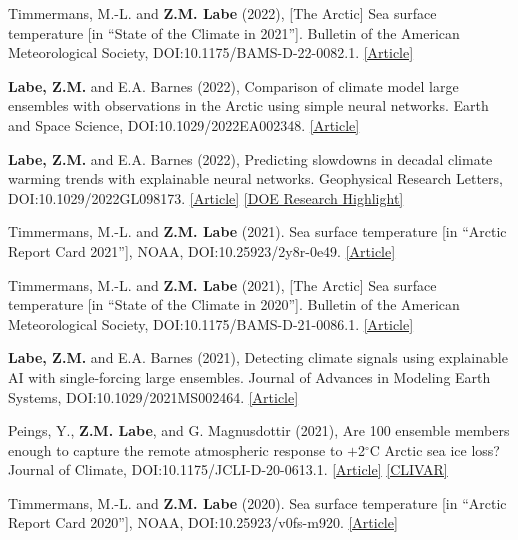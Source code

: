 \documentclass[margin,line,palatino,courier,10pt]{res}
\begin{document}
\begin{resume}
\begin{etaremune}[leftmargin=0in,topsep=0in,parsep=0in]
\item Timmermans, M.-L. and \textbf{Z.M. Labe} (2022), [The Arctic] Sea surface temperature [in ``State of the Climate in 2021'']. Bulletin of the American Meteorological Society, DOI:10.1175/BAMS-D-22-0082.1. \href{https://doi.org/10.1175/BAMS-D-22-0082.1}{[Article]}
\item \textbf{Labe, Z.M.} and E.A. Barnes (2022), Comparison of climate model large ensembles with observations in the Arctic using simple neural networks. Earth and Space Science, DOI:10.1029/2022EA002348. \href{https://doi.org/10.1029/2022EA002348}{[Article]}
\item \textbf{Labe, Z.M.} and E.A. Barnes (2022), Predicting slowdowns in decadal climate warming trends with explainable neural networks. Geophysical Research Letters, DOI:10.1029/2022GL098173. \href{https://doi.org/10.1029/2022GL098173}{[Article]} \href{https://climatemodeling.science.energy.gov/research-highlights/predicting-slowdowns-decadal-climate-warming-trends-explainable-neural-networks}{[DOE Research Highlight]}
\item Timmermans, M.-L. and \textbf{Z.M. Labe} (2021). Sea surface temperature [in ``Arctic Report Card 2021''], NOAA, DOI:10.25923/2y8r-0e49. \href{https://www.arctic.noaa.gov/Report-Card/Report-Card-2021/ArtMID/8022/ArticleID/944/Sea-Surface-Temperature}{[Article]}
\item Timmermans, M.-L. and \textbf{Z.M. Labe} (2021), [The Arctic] Sea surface temperature [in ``State of the Climate in 2020'']. Bulletin of the American Meteorological Society, DOI:10.1175/BAMS-D-21-0086.1. \href{https://doi.org/10.1175/BAMS-D-21-0086.1}{[Article]}
\item \textbf{Labe, Z.M.} and E.A. Barnes (2021), Detecting climate signals using explainable AI with single-forcing large ensembles. Journal of Advances in Modeling Earth Systems, DOI:10.1029/2021MS002464. \href{https://agupubs.onlinelibrary.wiley.com/doi/abs/10.1029/2021MS002464}{[Article]}
\item Peings, Y., \textbf{Z.M. Labe}, and G. Magnusdottir (2021), Are 100 ensemble members enough to capture the remote atmospheric response to $+$2$^{\circ}$C Arctic sea ice loss? Journal of Climate, DOI:10.1175/JCLI-D-20-0613.1. \href{https://journals.ametsoc.org/view/journals/clim/aop/JCLI-D-20-0613.1/JCLI-D-20-0613.1.xml}{[Article]} \href{https://usclivar.org/research-highlights/how-reproducible-response-2degc-arctic-sea-ice-loss-large-ensemble-simulations}{[CLIVAR]}
\item Timmermans, M.-L. and \textbf{Z.M. Labe} (2020). Sea surface temperature [in ``Arctic Report Card 2020''], NOAA, DOI:10.25923/v0fs-m920. \href{https://arctic.noaa.gov/Report-Card/Report-Card-2020/ArtMID/7975/ArticleID/885/Sea-Surface-Temperature}{[Article]}

\end{etaremune}
\end{resume}
\end{document}
